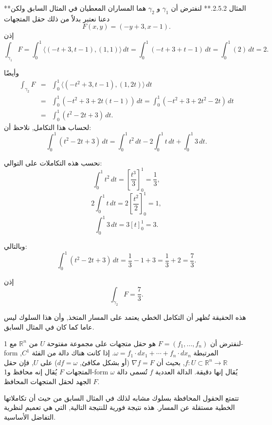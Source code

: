 \begin{exemple}
    
**المثال 2.5.2.** 
لنفترض أن \( \gamma_1 \) و \( \gamma_2 \) هما المساران المعطيان في المثال السابق ولكن دعنا نعتبر بدلاً من ذلك حقل المتجهات
\[ F(x, y) = (-y + 3, x - 1). \]
إذن
\[ \int_{\gamma_1} F = \int_0^1 \langle (-t + 3, t - 1), (1, 1) \rangle \, dt = \int_0^1 (-t + 3 + t - 1) \, dt = \int_0^1 (2) \, dt = 2. \]

وأيضًا
\begin{eqnarray*}
     \int_{\gamma_2} F &=& \int_0^1 \langle (-t^2 + 3, t - 1), (1, 2t) \rangle \,dt 
     \\
     &=& \int_0^1 (-t^2 + 3 + 2t(t - 1)) \, dt = \int_0^1 (-t^2 + 3 + 2t^2 - 2t) \, dt 
     \\
     &=& \int_0^1 (t^2 - 2t + 3) \, dt.
\end{eqnarray*}
لحساب هذا التكامل, نلاحظ أن:
\[ \int_0^1 (t^2 - 2t + 3) \, dt = \int_0^1 t^2 \, dt - 2 \int_0^1 t \, dt + \int_0^1 3 \, dt. \]

نحسب هذه التكاملات على التوالي:
\[ \int_0^1 t^2 \, dt = \left[ \frac{t^3}{3} \right]_0^1 = \frac{1}{3}, \]
\[ 2 \int_0^1 t \, dt = 2 \left[ \frac{t^2}{2} \right]_0^1 = 1, \]
\[ \int_0^1 3 \, dt = 3 \left[ t \right]_0^1 = 3. \]

وبالتالي:
\[ \int_0^1 (t^2 - 2t + 3) \, dt = \frac{1}{3} - 1 + 3 = \frac{1}{3} + 2 = \frac{7}{3}. \]

إذن
\[ \int_{\gamma_2} F = \frac{7}{3}. \]
\end{exemple}

هذه الحقيقة تُظهر أن التكامل الخطي يعتمد على المسار المتخذ, وأن هذا السلوك ليس عاما كما كان في المثال السابق.

\begin{definition}
لنفترض أن \( F = (f_1, \ldots, f_n) \) هو حقل متجهات على مجموعة مفتوحة \( U \) من \( \mathbb{R}^n \) مع 1-form المرتبطة \( \omega = f_1 \cdot dx_1 + \cdots + f_n \cdot dx_n \). إذا كانت هناك دالة من الفئة \( C^1 \), \( f : U \subset \mathbb{R}^n \to \mathbb{R} \), بحيث أن \( \nabla f = F \) (أو بشكل مكافئ, \( df = \omega \)) على \( U \), فإن حقل المتجهات \( F \) يُقال إنه محافظ و1-form \( \omega \) يُقال إنها دقيقة. الدالة العددية \( f \) تُسمى دالة الجهد لحقل المتجهات المحافظ \( F \).
\end{definition}

تتمتع الحقول المحافظة بسلوك مشابه لذلك في المثال السابق من حيث أن تكاملاتها الخطية مستقلة عن المسار. هذه نتيجة فورية للنتيجة التالية, التي هي تعميم لنظرية التفاضل الأساسية.

